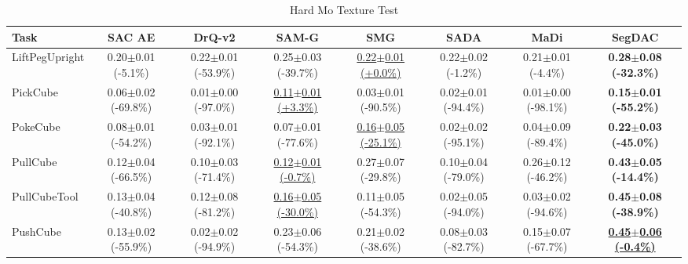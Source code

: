 \begin{table}[htbp]
\centering
\scriptsize
\caption{Hard Mo Texture Test}
\label{tab:appendix_motexturetest_hard}
\begin{adjustbox}{max width=\textwidth}
\begin{tabular}{l*{7}{c}}
\toprule
\textbf{Task} & \textbf{SAC AE} & \textbf{DrQ-v2} & \textbf{SAM-G} & \textbf{SMG} & \textbf{SADA} & \textbf{MaDi} & \textbf{SegDAC} \\
\midrule
LiftPegUpright & 0.20$\pm$0.01 \scriptsize{(-5.1\%)} & 0.22$\pm$0.01 \scriptsize{(-53.9\%)} & 0.25$\pm$0.03 \scriptsize{(-39.7\%)} & \underline{0.22$\pm$0.01 \scriptsize{(+0.0\%)}} & 0.22$\pm$0.02 \scriptsize{(-1.2\%)} & 0.21$\pm$0.01 \scriptsize{(-4.4\%)} & \textbf{0.28$\pm$0.08 \scriptsize{(-32.3\%)}} \\
PickCube & 0.06$\pm$0.02 \scriptsize{(-69.8\%)} & 0.01$\pm$0.00 \scriptsize{(-97.0\%)} & \underline{0.11$\pm$0.01 \scriptsize{(+3.3\%)}} & 0.03$\pm$0.01 \scriptsize{(-90.5\%)} & 0.02$\pm$0.01 \scriptsize{(-94.4\%)} & 0.01$\pm$0.00 \scriptsize{(-98.1\%)} & \textbf{0.15$\pm$0.01 \scriptsize{(-55.2\%)}} \\
PokeCube & 0.08$\pm$0.01 \scriptsize{(-54.2\%)} & 0.03$\pm$0.01 \scriptsize{(-92.1\%)} & 0.07$\pm$0.01 \scriptsize{(-77.6\%)} & \underline{0.16$\pm$0.05 \scriptsize{(-25.1\%)}} & 0.02$\pm$0.02 \scriptsize{(-95.1\%)} & 0.04$\pm$0.09 \scriptsize{(-89.4\%)} & \textbf{0.22$\pm$0.03 \scriptsize{(-45.0\%)}} \\
PullCube & 0.12$\pm$0.04 \scriptsize{(-66.5\%)} & 0.10$\pm$0.03 \scriptsize{(-71.4\%)} & \underline{0.12$\pm$0.01 \scriptsize{(-0.7\%)}} & 0.27$\pm$0.07 \scriptsize{(-29.8\%)} & 0.10$\pm$0.04 \scriptsize{(-79.0\%)} & 0.26$\pm$0.12 \scriptsize{(-46.2\%)} & \textbf{0.43$\pm$0.05 \scriptsize{(-14.4\%)}} \\
PullCubeTool & 0.13$\pm$0.04 \scriptsize{(-40.8\%)} & 0.12$\pm$0.08 \scriptsize{(-81.2\%)} & \underline{0.16$\pm$0.05 \scriptsize{(-30.0\%)}} & 0.11$\pm$0.05 \scriptsize{(-54.3\%)} & 0.02$\pm$0.05 \scriptsize{(-94.0\%)} & 0.03$\pm$0.02 \scriptsize{(-94.6\%)} & \textbf{0.45$\pm$0.08 \scriptsize{(-38.9\%)}} \\
PushCube & 0.13$\pm$0.02 \scriptsize{(-55.9\%)} & 0.02$\pm$0.02 \scriptsize{(-94.9\%)} & 0.23$\pm$0.06 \scriptsize{(-54.3\%)} & 0.21$\pm$0.02 \scriptsize{(-38.6\%)} & 0.08$\pm$0.03 \scriptsize{(-82.7\%)} & 0.15$\pm$0.07 \scriptsize{(-67.7\%)} & \textbf{\underline{0.45$\pm$0.06 \scriptsize{(-0.4\%)}}} \\

\end{tabular}
\end{adjustbox}
\end{table}
